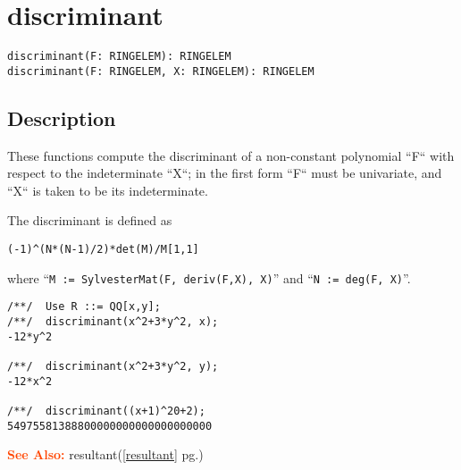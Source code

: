 \documentclass[a4paper]{mybook}
\newenvironment{command}{}{} %
\newcommand\SeeAlso{\par\textcolor{OrangeRed}{\textbf{\large See Also: }}}
\begin{document}
\section{discriminant}
\label{discriminant}
\begin{command} %


\begin{Verbatim}[label=syntax, rulecolor=\color{MidnightBlue},
frame=single]
discriminant(F: RINGELEM): RINGELEM
discriminant(F: RINGELEM, X: RINGELEM): RINGELEM
\end{Verbatim}


\subsection*{Description}

These functions compute the discriminant of a non-constant polynomial ``F``
with respect to the indeterminate ``X``; in the first form ``F`` must be
univariate, and ``X`` is taken to be its indeterminate.
\par 
The discriminant is defined as
\begin{verbatim}
(-1)^(N*(N-1)/2)*det(M)/M[1,1]
\end{verbatim}
where ``\verb&M := SylvesterMat(F, deriv(F,X), X)&''
and  ``\verb&N := deg(F, X)&''.
\begin{Verbatim}[label=example, rulecolor=\color{PineGreen}, frame=single]
/**/  Use R ::= QQ[x,y];
/**/  discriminant(x^2+3*y^2, x);
-12*y^2

/**/  discriminant(x^2+3*y^2, y);
-12*x^2

/**/  discriminant((x+1)^20+2);
54975581388800000000000000000000
\end{Verbatim}


\SeeAlso %
  resultant(\ref{resultant} pg.\pageref{resultant})
\end{command} %
\end{document}
